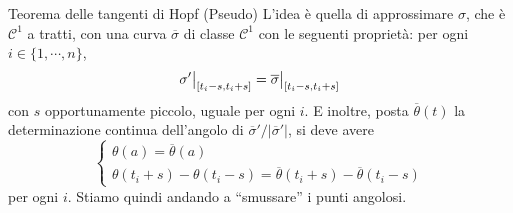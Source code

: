 \documentclass[a4paper]{article}
\begin{document}
\begin{snippetproof}{Teorema delle tangenti di Hopf (Pseudo)}
    L'idea è quella di approssimare \(\sigma\), che è \(\mathcal C^1\)
    a tratti, con una curva \(\overline \sigma\)
    di classe \(\mathcal C^1\) con le seguenti proprietà:
    per ogni \(i \in \{1, \cdots, n\}\),
    \[
        \restr{\sigma'}{[t_i - s, t_i + s]}
        = \restr{\overline \sigma}{[t_i - s, t_i + s]}
    \]
    con \(s\) opportunamente piccolo, uguale per ogni \(i\).
    E inoltre, posta \(\overline\theta(t)\) la determinazione continua dell'angolo
    di \(\overline\sigma' / |\overline\sigma'|\), si deve avere
    \[
        \begin{cases}
            \theta(a) = \overline\theta(a) \\
            \theta(t_i + s) - \theta(t_i - s) = \overline\theta(t_i + s) -
            \overline\theta(t_i - s)
        \end{cases}
    \]
    per ogni \(i\).
    Stiamo quindi andando a ``smussare'' i punti angolosi.
    \begin{center}
\end{center}
\end{snippetproof}
\end{document}
